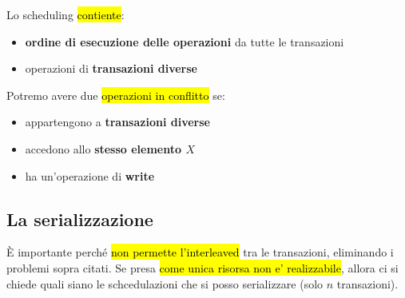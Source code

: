 Lo scheduling \hl{contiente}:

\begin{itemize}
    \item \textbf{ordine di esecuzione delle operazioni} da tutte le transazioni
    \item operazioni di \textbf{transazioni diverse}
\end{itemize}

Potremo avere due \hl{operazioni in conflitto} se:

\begin{itemize}
    \item appartengono a \textbf{transazioni diverse}
    \item accedono allo \textbf{stesso elemento $X$}
    \item ha un'operazione di \textbf{write}
\end{itemize}



\subsection{La serializzazione}

È importante perché \hl{non permette l'interleaved} tra le transazioni, eliminando i problemi sopra citati. Se presa \hl{come unica risorsa non e' realizzabile}, allora ci si chiede quali siano le schcedulazioni che si posso serializzare (solo $n$ transazioni).
